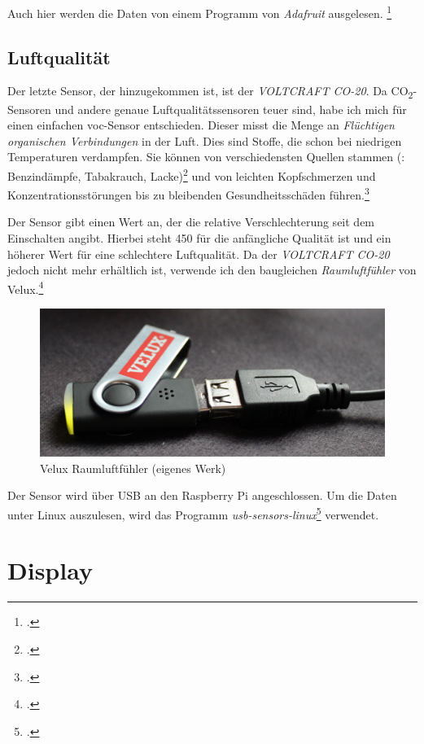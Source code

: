 Auch hier werden die Daten von einem Programm von \emph{Adafruit} ausgelesen. \footcite[Using the Adafruit BMP Python Library (Updated)]{bmp058_adafruit}

\subsection{Luftqualität}
\label{subsec:Luftqualitat}
Der letzte Sensor, der hinzugekommen ist, ist der \emph{VOLTCRAFT CO-20}. Da CO\textsubscript{2}-Sensoren und andere genaue Luftqualitätssensoren teuer sind, habe ich mich für einen einfachen \acrshort{voc}-Sensor entschieden. Dieser misst die Menge an \emph{Flüchtigen organischen Verbindungen} in der Luft. Dies sind Stoffe, die schon bei niedrigen Temperaturen verdampfen. Sie können von verschiedensten Quellen stammen (\zB: Benzindämpfe, Tabakrauch, Lacke)\footcite[41\psqq]{innenraum} und von leichten Kopfschmerzen und Konzentrationsstörungen bis zu bleibenden Gesundheitsschäden führen.\footcite[Gesundheitliche Wirkung]{VOC}

Der Sensor gibt einen Wert an, der die relative Verschlechterung seit dem Einschalten angibt. Hierbei steht 450 für die anfängliche Qualität ist und ein höherer Wert für eine schlechtere Luftqualität.
Da der \emph{VOLTCRAFT CO-20} jedoch nicht mehr erhältlich ist, verwende ich den baugleichen \emph{Raumluftfühler} von Velux.\footcite{Velux}

\begin{figure}[h]
  \centering
     \includegraphics[width=\textwidth]{figures/velux.jpg}
  \caption{Velux Raumluftfühler (eigenes Werk)}
  \label{fig:velux}
\end{figure}

Der Sensor wird über USB an den Raspberry Pi angeschlossen. Um die Daten unter Linux auszulesen, wird das Programm \emph{usb-sensors-linux}\footcite{usb-sensors-linux} verwendet.

\section{Display}
\label{sec:Display}

